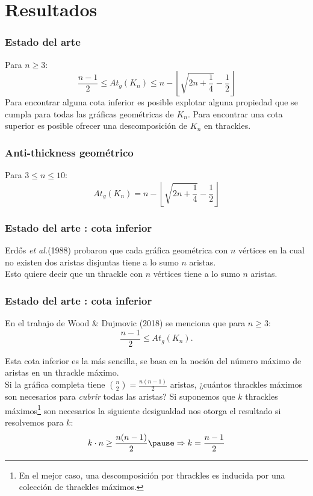 \section{Resultados}
\begin{frame}
\frametitle{Estado del arte}
Para $n \geq 3$:
\[  \frac{n-1}{2} \leq At_g(K_n) \leq n - \left\lfloor\sqrt{2n + \frac{1}{4}} - \frac{1}{2} \right\rfloor \]
Para encontrar alguna cota inferior es posible explotar alguna propiedad que se cumpla para todas las gráficas geométricas de $K_n$. Para encontrar una cota superior es posible ofrecer una descomposición de $K_n$ en thrackles.
\end{frame}
\begin{frame}
\frametitle{Anti-thickness geométrico}
Para $3 \leq n \leq 10$:
\[  At_g(K_n) = n - \left\lfloor\sqrt{2n + \frac{1}{4}} - \frac{1}{2} \right\rfloor \]
\end{frame}

\begin{frame}
\frametitle{Estado del arte : cota inferior}
Erd\H{o}s \emph{et al.}(1988) probaron que cada gráfica geométrica con $n$ vértices en la cual no existen dos aristas disjuntas tiene a lo sumo $n$ aristas. 
\\[10pt]
Esto quiere decir que un thrackle con $n$ vértices tiene a lo sumo $n$ aristas.
\end{frame}
\begin{frame}
\frametitle{Estado del arte : cota inferior}
En el trabajo de Wood \& Dujmovic (2018) se menciona que para $n \geq 3$:
\[  \frac{n-1}{2} \leq At_g(K_n).\] 
\pause

Esta cota inferior es la más sencilla, se basa en la noción del número máximo de aristas en un thrackle máximo. 
\\[5pt]
Si la gráfica completa tiene $\binom{n}{2} = \frac{n(n-1)}{2}$ aristas, ¿cuántos thrackles máximos son necesarios para \emph{cubrir} todas las aristas? Si suponemos que $k$ thrackles máximos\footnote{En el mejor caso, una descomposición por thrackles es inducida por una colección de thrackles máximos.} son necesarios la siguiente desigualdad nos otorga el resultado si resolvemos para $k$: \[ k\cdot n \geq \frac{n(n-1)}{2} \pause \Rightarrow k = \frac{n-1}{2}\]
\end{frame}

